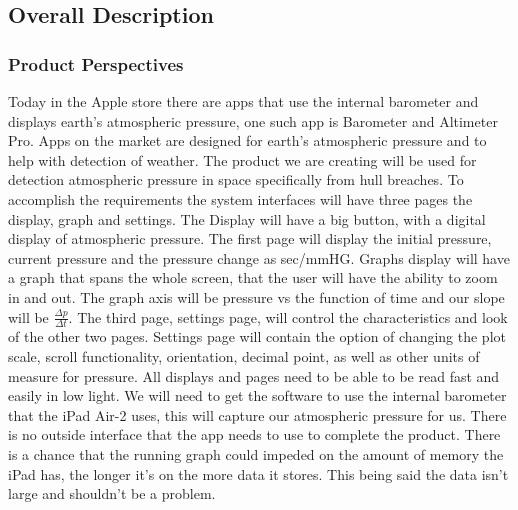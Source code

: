 \documentclass[onecolumn, draftclsnofoot,10pt, compsoc]{IEEEtran}
\begin{document}
\subsection{Overall Description}

\subsubsection{Product Perspectives}
Today in the Apple store there are apps that use the internal barometer and displays earth's atmospheric pressure, one such app is Barometer and Altimeter Pro.
Apps on the market are designed for earth's atmospheric pressure and to help with detection of weather.
The product we are creating will be used for detection atmospheric pressure in space specifically from hull breaches.
To accomplish the requirements the system interfaces will have three pages the display, graph and settings.
The Display will have a big button, with a digital display of atmospheric pressure.
The first page will display the initial pressure, current pressure and the pressure change as sec/mmHG.
Graphs display will have a graph that spans the whole screen, that the user will have the ability to zoom in and out.
 The graph axis will be pressure vs the function of time and our slope will be $\frac{\Delta p}{\Delta t}$.
 The third page, settings page, will control the characteristics and look of the other two pages.
Settings page will contain the option of changing the plot scale, scroll functionality, orientation, decimal point, as well as other units of measure for pressure.
 All displays and pages need to be able to be read fast and easily in low light.
We will need to get the software to use the internal barometer that the iPad Air-2 uses, this will capture our atmospheric pressure for us.
There is no outside interface that the app needs to use to complete the product.
There is a chance that the running graph could impeded on the amount of memory the iPad has, the longer it's on the more data it stores.
This being said the data isn't large and shouldn't be a problem.
\end{document}
